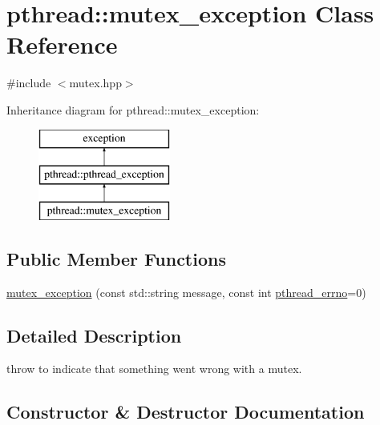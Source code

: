\hypertarget{classpthread_1_1mutex__exception}{}\section{pthread\+:\+:mutex\+\_\+exception Class Reference}
\label{classpthread_1_1mutex__exception}


{\ttfamily \#include $<$mutex.\+hpp$>$}

Inheritance diagram for pthread\+:\+:mutex\+\_\+exception\+:\begin{figure}[H]
\begin{center}
\leavevmode
\includegraphics[height=3.000000cm]{classpthread_1_1mutex__exception}
\end{center}
\end{figure}
\subsection*{Public Member Functions}
\begin{DoxyCompactItemize}
\item 
\hyperlink{classpthread_1_1mutex__exception_a250f82ebe285c7cb28986a7086f3eae8}{mutex\+\_\+exception} (const std\+::string message, const int \hyperlink{classpthread_1_1pthread__exception_a8a5c22a403ebd14635e912295fe02a1e}{pthread\+\_\+errno}=0)
\end{DoxyCompactItemize}


\subsection{Detailed Description}
throw to indicate that something went wrong with a mutex. 

\subsection{Constructor \& Destructor Documentation}

